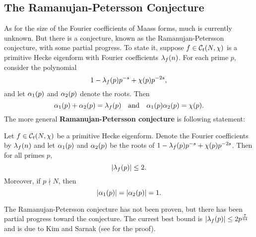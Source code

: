    \subsection*{The Ramanujan-Petersson Conjecture}
      As for the size of the Fourier coefficients of Maass forms, much is currently unknown. But there is a conjecture, known as the Ramanujan-Petersson conjecture, with some partial progress. To state it, suppose $f \in \mathcal{C}_{t}(N,\chi)$ is a primitive Hecke eigenform with Fourier coefficients $\lambda_{f}(n)$. For each prime $p$, consider the polynomial
      \[
        1-\lambda_{f}(p)p^{-s}+\chi(p)p^{-2s},
      \]
      and let $\alpha_{1}(p)$ and $\alpha_{2}(p)$ denote the roots. Then
      \[
        \alpha_{1}(p)+\alpha_{2}(p) = \lambda_{f}(p) \quad \text{and} \quad \alpha_{1}(p)\alpha_{2}(p) = \chi(p).
      \]
      The more general \textbf{Ramanujan-Petersson conjecture} is following statement:

      \begin{theorem}
        Let $f \in \mathcal{C}_{t}(N,\chi)$ be a primitive Hecke eigenform. Denote the Fourier coefficients by $\lambda_{f}(n)$ and let $\alpha_{1}(p)$ and $\alpha_{2}(p)$ be the roots of $1-\lambda_{f}(p)p^{-s}+\chi(p)p^{-2s}$. Then for all primes $p$,
        \[
          |\lambda_{f}(p)| \le 2.
        \]
        Moreover, if $p \nmid N$, then
        \[
          |\alpha_{1}(p)| = |\alpha_{2}(p)| = 1.
        \]
      \end{theorem}

      The Ramanujan-Petersson conjecture has not been proven, but there has been partial progress toward the conjecture. The currest best bound is $|\lambda_{f}(p)| \le 2p^{\frac{7}{64}}$ and is due to Kim and Sarnak (see \cite{kim2003functoriality} for the proof).